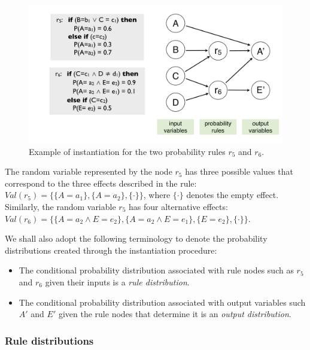 \begin{figure}[h]
\centering
\includegraphics[scale=0.25]{imgs/ruleinstantiation.pdf}
\caption{Example of instantiation for the two probability rules $r_5$ and $r_6$. }
\label{fig:instantiationprob}
\end{figure}

The random variable represented by the node $r_5$ has three possible values that correspond to the three effects described in the rule: $\mathit{Val}(r_5) = \{ \{A\!=\!a_1\}, \{A\!=\!a_2\}, \{\cdot\}\}$, where $\{\cdot\}$ denotes the empty effect.  Similarly, the random variable $r_5$ has four alternative effects: $\mathit{Val}(r_6) = \{\{A\!=\!a_2 \land E\!=\!e_2\}, \{A\!=\!a_2 \land E\!=\!e_1\}, \{E=e_2\}, \{\cdot\}\}$. 

We shall also adopt the following terminology to denote the probability distributions created through the instantiation procedure: 
\begin{itemize}
\item The conditional probability distribution associated with rule nodes such as $r_5$ and $r_6$ given their inputs is a \textit{rule distribution}.
\item The conditional probability distribution associated with output variables such $A'$ and $E'$ given the rule nodes that determine it is an \textit{output distribution}.
\end{itemize}

\subsubsection*{Rule distributions}


